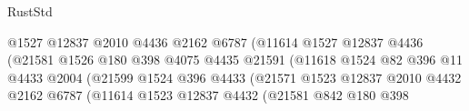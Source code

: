 \begin{lexlean}{RustStd}
\begin{coremodule}
{\begin{coremodule}
{{{{{{{{{{{{{{{{{{{{{{{{{{{{{{{                                                @1527
                                                @12837
                                                @2010
                                                @4436
                                                @2162
                                                @6787
                                                (@11614
                                                  @1527
                                                  @12837
                                                  @4436
                                                  (@21581
                                                    @1526
                                                    @180
                                                    @398
                                                    @4075
                                                    @4435
                                                    @21591
                                                    (@11618
                                                      @1524
                                                      @82
                                                      @396
                                                      @11
                                                      @4433
                                                      @2004
                                                      (@21599
                                                        @1524
                                                        @396
                                                        @4433
                                                        (@21571
                                                          @1523
                                                          @12837
                                                          @2010
                                                          @4432
                                                          @2162
                                                          @6787
                                                          (@11614
                                                            @1523
                                                            @12837
                                                            @4432
                                                            (@21581
                                                              @842
                                                              @180
                                                              @398
}}}}}}}}}}}}}}}}}}}}}}}}}}}}}}}
\end{coremodule}}
\end{coremodule}
\end{lexlean}
